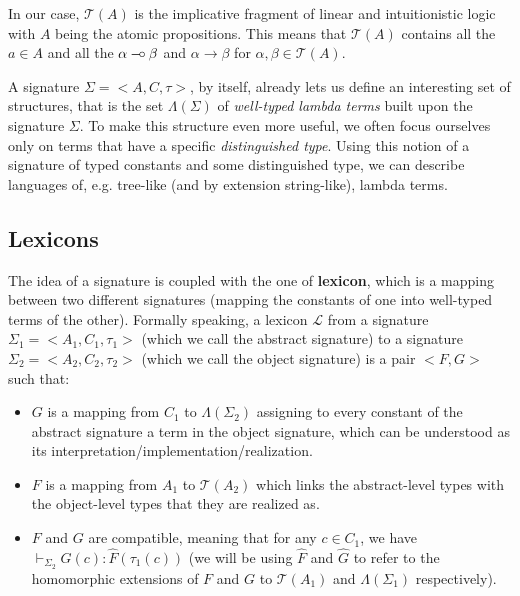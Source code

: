 \documentclass{llncs}
\def\limp {\mathbin{{-}\mkern-3.5mu{\circ}}}
\begin{document}
In our case, $\mathcal{T}(A)$ is the implicative fragment of linear and
intuitionistic logic with $A$ being the atomic propositions. This means
that $\mathcal{T}(A)$ contains all the $a \in A$ and all the $\alpha \limp
\beta$ and $\alpha \to \beta$ for $\alpha, \beta \in \mathcal{T}(A)$.

A signature $\Sigma = \mathopen{<}A, C, \tau\mathclose{>}$, by itself, already
lets us define an interesting set of structures, that is the set
$\Lambda(\Sigma)$ of \emph{well-typed lambda terms} built upon the signature
$\Sigma$. To make this structure even more useful, we often focus ourselves
only on terms that have a specific \emph{distinguished type}. Using this
notion of a signature of typed constants and some distinguished type, we can
describe languages of, e.g. tree-like (and by extension string-like), lambda
terms.

\subsection{Lexicons}

The idea of a signature is coupled with the one of \textbf{lexicon},
which is a mapping between two different signatures (mapping the
constants of one into well-typed terms of the other). Formally speaking,
a lexicon $\mathcal{L}$ from a signature $\Sigma_1 = \mathopen{<}A_1,
C_1, \tau_1\mathclose{>}$ (which we call the abstract signature) to a
signature $\Sigma_2 = \mathopen{<}A_2, C_2, \tau_2\mathclose{>}$ (which
we call the object signature) is a pair $\mathopen{<}F, G\mathclose{>}$
such that:

\begin{itemize}
\item $G$ is a mapping from $C_1$ to $\Lambda(\Sigma_2)$ assigning to
  every constant of the abstract signature a term in the object
  signature, which can be understood as its
  interpretation/implementation/realization.
\item $F$ is a mapping from $A_1$ to $\mathcal{T}(A_2)$ which links the
  abstract-level types with the object-level types that they are
  realized as.
\item $F$ and $G$ are compatible, meaning that for any $c \in C_1$, we
  have $\vdash_{\Sigma_2} G(c) : \hat{F}(\tau_1(c))$ (we will be using
  $\hat{F}$ and $\hat{G}$ to refer to the homomorphic extensions of $F$
  and $G$ to $\mathcal{T}(A_1)$ and $\Lambda(\Sigma_1)$
  respectively).
\end{itemize}
\end{document}
